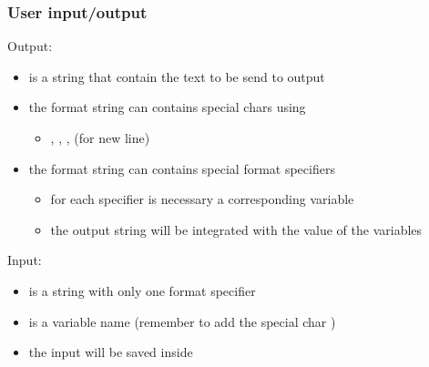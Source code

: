 \begin{frame}
  \frametitle{User input/output}
  \begin{block}{Output: }
    \begin{itemize}
    \item {} is a string that contain the text to be send to output
    \item the format string can contains special chars using \cc{\\}
      \begin{itemize}
        \item \cc{\\\\}, , \cc{\\\%}, \cc{\\n} (for new line)
      \end{itemize}
    \item the format string can contains special \alert{format
        specifiers}
      \begin{itemize}
      \item for each specifier is necessary a corresponding variable
      \item the output string will be integrated with the value of the
        variables
      \end{itemize}
    \end{itemize}
  \end{block}
  \begin{block}{Input: }
    \begin{itemize}
    \item {} is a string with only one \alert{format specifier}
    \item {} is a variable name (remember to add the special
      char \cc{\&})
    \item the input will be saved inside 
    \end{itemize}
  \end{block}
\end{frame}

